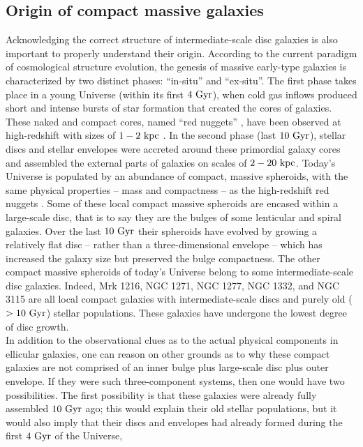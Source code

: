 \documentclass[useAMS,usenatbib,article]{mn2e}
\begin{document}
\subsection{Origin of compact massive galaxies}
Acknowledging the correct structure of intermediate-scale disc galaxies is also important to properly understand their origin. 
According to the current paradigm of cosmological structure evolution, 
the genesis of massive early-type galaxies is characterized by two distinct phases: ``in-situ'' and ``ex-situ''. 
The first phase takes place in a young Universe (within its first $4~\rm Gyr$), 
when cold gas inflows produced short and intense bursts of star formation that created the cores of galaxies. 
These naked and compact cores, named ``red nuggets'' \citep{damjanov2009}, have been observed at high-redshift with sizes of $1-2~\rm kpc$ \citep{vandokkum2008}.
In the second phase (last $10~\rm Gyr$), stellar discs and stellar envelopes 
were accreted around these primordial galaxy cores and assembled the external parts of galaxies on scales of $2-20~\rm kpc$. 
Today's Universe is populated by an abundance of compact, massive spheroids, 
with the same physical properties -- mass and compactness -- as the high-redshift red nuggets \citep{GDS2015}. 
Some of these local compact massive spheroids are encased within a large-scale disc, 
that is to say they are the bulges of some lenticular and spiral galaxies. 
Over the last $10~\rm Gyr$ their spheroids have evolved by growing a relatively flat disc -- 
rather than a three-dimensional envelope -- 
which has increased the galaxy size but preserved the bulge compactness. 
The other compact massive spheroids of today's Universe belong to some intermediate-scale disc galaxies. 
Indeed, Mrk 1216, NGC 1271, NGC 1277, NGC 1332, and NGC 3115 are all local compact galaxies 
with intermediate-scale discs and purely old ($>10~\rm Gyr$) stellar populations. 
These galaxies have undergone the lowest degree of disc growth. \\
In addition to the observational clues as to the actual physical components in ellicular galaxies, 
one can reason on other grounds as to why these compact galaxies are not comprised of an inner bulge 
plus large-scale disc plus outer envelope. 
If they were such three-component systems, then one would have two possibilities. 
The first possibility is that these galaxies were already fully assembled $10~\rm Gyr$ ago; 
this would explain their old stellar populations, 
but it would also imply that their discs and envelopes had already formed during the first $4~\rm Gyr$ of the Universe, 
\end{document}
